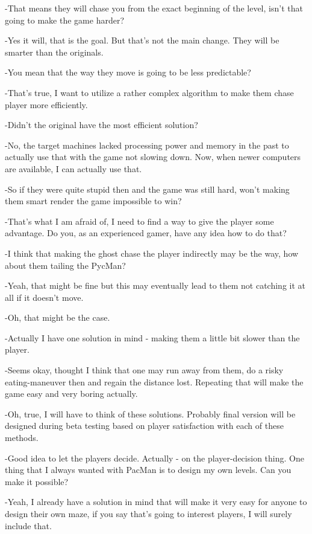 \documentclass[11pt,a4paper,notitlepage]{report}
\begin{document}
			-That means they will chase you from the exact beginning of the level, isn't that going to make the game harder?
			
			-Yes it will, that is the goal. But that's not the main change. They will be smarter than the originals.
			
			-You mean that the way they move is going to be less predictable?
			
			-That's true, I want to utilize a rather complex algorithm to make them chase player more efficiently.
			
			-Didn't the original have the most efficient solution?
			
			-No, the target machines lacked processing power and memory in the past to actually use that with the game not slowing down. Now, when newer computers are available, I can actually use that.
			
			-So if they were quite stupid then and the game was still hard, won't making them smart render the game impossible to win?
			
			-That's what I am afraid of, I need to find a way to give the player some advantage. Do you, as an experienced gamer, have any idea how to do that?
			
			-I think that making the ghost chase the player indirectly may be the way, how about them tailing the PycMan?
			
			-Yeah, that might be fine but this may eventually lead to them not catching it at all if it doesn't move.
			
			-Oh, that might be the case.
			
			-Actually I have one solution in mind - making them a little bit slower than the player.
			
			-Seems okay, thought I think that one may run away from them, do a risky eating-maneuver then and regain the distance lost. Repeating that will make the game easy and very boring actually.
			
			-Oh, true, I will have to think of these solutions. Probably final version will be designed during beta testing based on player satisfaction with each of these methods.
			
			-Good idea to let the players decide. Actually - on the player-decision thing. One thing that I always wanted with PacMan is to design my own levels. Can you make it possible?
			
			-Yeah, I already have a solution in mind that will make it very easy for anyone to design their own maze, if you say that's going to interest players, I will surely include that.
			
\end{document}
